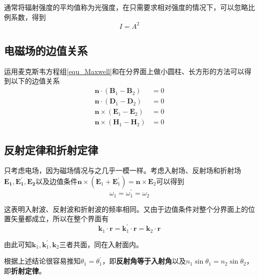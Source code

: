 \documentclass[UTF8]{ctexart}
\begin{document}
	通常将辐射强度的平均值称为光强度，在只需要求相对强度的情况下，可以忽略比例系数，得到
	\begin{equation}
		I=A^{2}
	\end{equation}
	
	\subsection{电磁场的边值关系}
	运用麦克斯韦方程组\ref{equ_Maxwell}和在分界面上做小圆柱、长方形的方法可以得到以下的边值关系
	\begin{equation}
	\begin{aligned}
	\boldsymbol{n} \cdot \left(\boldsymbol{B}_{1} - \boldsymbol{B}_{2}\right) &= 0
	\\
	\boldsymbol{n} \cdot \left(\boldsymbol{D}_{1} - \boldsymbol{D}_{2}\right) &= 0
	\\
	\boldsymbol{n} \times \left(\boldsymbol{E}_{1} - \boldsymbol{E}_{2}\right) &= 0
	\\
	\boldsymbol{n} \times \left(\boldsymbol{H}_{1} - \boldsymbol{H}_{2}\right) &= 0
	\end{aligned}
	\end{equation}
	
	\subsection{反射定律和折射定律}
	只考虑电场，因为磁场情况与之几乎一模一样。考虑入射场、反射场和折射场$ \boldsymbol{E_{1}}, \boldsymbol{E_{1}^{\prime}}, \boldsymbol{E_{2}} $以及边值条件$ \boldsymbol{n} \times \left(\boldsymbol{E}_{1}+\boldsymbol{E}_{1}^{\prime}\right) = \boldsymbol{n} \times \boldsymbol{E} _{2}$可以得到
	\begin{equation}
		\omega_{1} = \omega_{1}^{\prime} = \omega_{2}
	\end{equation}
	
\noindent 这表明入射波、反射波和折射波的频率相同。又由于边值条件对整个分界面上的位置矢量都成立，所以在整个界面有
\begin{equation}
	\boldsymbol{k}_{1} \cdot \boldsymbol{r} = \boldsymbol{k}_{1}^{\prime} \cdot \boldsymbol{r} = \boldsymbol{k}_{2} \cdot \boldsymbol{r}
\end{equation}

\noindent 由此可知$ \boldsymbol{k}_{1}, \boldsymbol{k}_{1}^{\prime}, \boldsymbol{k}_{2} $三者共面，同在入射面内。

	根据上述结论很容易推知$ \theta_{1} = \theta_{1}^{\prime} $，即\textbf{反射角等于入射角}以及$ n_{1} \sin \theta_{1} = n_{2} \sin \theta_{2} $，即\textbf{折射定律}。
	
\end{document}
